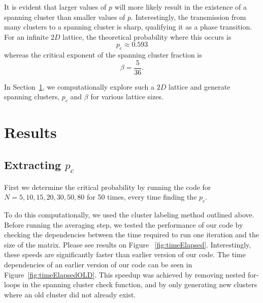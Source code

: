 \documentclass[12pt]{article}
\begin{document}
It is evident that larger values of $p$ will more likely result in the existence of a spanning cluster than smaller values of $p$. Interestingly, the transmission from many clusters to a spanning cluster is sharp, qualifying it as a phase transition. For an infinite $2D$ lattice, the theoretical probability where this occurs is
\begin{equation}
  \label{eq:theoreticalpc}
  p_c \approx 0.593
\end{equation}
whereas the critical exponent of the spanning cluster fraction is
\begin{equation}
  \label{eq:theoreticalbeta}
  \beta = \frac{5}{36}.
\end{equation}

In Section~\ref{sec:results}, we computationally explore such a $2D$ lattice and generate spanning clusters, $p_c$ and $\beta$ for various lattice sizes.

\section{Results}
\label{sec:results}

\subsection{Extracting $p_c$}
\label{sec:pc}

First we determine the critical probability by running the code for $N=5, 10, 15, 20, 30, 50, 80$ for 50 times, every time finding the $p_c$.

To do this computationally, we used the cluster labeling method outlined above. Before running the averaging step, we tested the performance of our code by checking the dependencies between the time required to run one iteration and the size of the matrix. Please see results on Figure ~\ref{fig:timeElapsed}. Interestingly, these speeds are significantly faster than earlier version of our code. The time dependencies of an earlier version of our code can be seen in Figure~\ref{fig:timeElapsedOLD}. This speedup was achieved by removing nested for-loops in the spanning cluster check function, and by only generating new clusters where an old cluster did not already exist.
\end{document}
